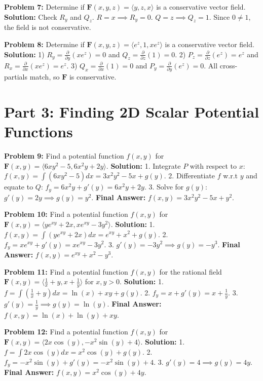 \documentclass[12pt]{article}
\begin{document}
\textbf{Problem 7:} Determine if $\mathbf{F}(x,y,z) = \langle y, z, x \rangle$ is a conservative vector field.
\textbf{Solution:} Check $R_y$ and $Q_z$. 
$R = x \implies R_y = 0$. $Q = z \implies Q_z = 1$. 
Since $0 \neq 1$, the field is not conservative.

\textbf{Problem 8:} Determine if $\mathbf{F}(x,y,z) = \langle e^z, 1, x e^z \rangle$ is a conservative vector field.
\textbf{Solution:} 
1) $R_y = \frac{\partial}{\partial y}(x e^z) = 0$ and $Q_z = \frac{\partial}{\partial z}(1) = 0$.
2) $P_z = \frac{\partial}{\partial z}(e^z) = e^z$ and $R_x = \frac{\partial}{\partial x}(x e^z) = e^z$.
3) $Q_x = \frac{\partial}{\partial x}(1) = 0$ and $P_y = \frac{\partial}{\partial y}(e^z) = 0$.
All cross-partials match, so $\mathbf{F}$ is conservative.

\section*{Part 3: Finding 2D Scalar Potential Functions}

\textbf{Problem 9:} Find a potential function $f(x,y)$ for $\mathbf{F}(x,y) = \langle 6xy^2 - 5, 6x^2y + 2y \rangle$.
\textbf{Solution:} 
1. Integrate $P$ with respect to $x$: $f(x,y) = \int (6xy^2 - 5) dx = 3x^2y^2 - 5x + g(y)$.
2. Differentiate $f$ w.r.t $y$ and equate to $Q$: $f_y = 6x^2y + g'(y) = 6x^2y + 2y$.
3. Solve for $g(y)$: $g'(y) = 2y \implies g(y) = y^2$. 
\textbf{Final Answer:} $f(x,y) = 3x^2y^2 - 5x + y^2$.

\textbf{Problem 10:} Find a potential function $f(x,y)$ for $\mathbf{F}(x,y) = \langle y e^{xy} + 2x, x e^{xy} - 3y^2 \rangle$.
\textbf{Solution:} 
1. $f(x,y) = \int (y e^{xy} + 2x) dx = e^{xy} + x^2 + g(y)$.
2. $f_y = x e^{xy} + g'(y) = x e^{xy} - 3y^2$.
3. $g'(y) = -3y^2 \implies g(y) = -y^3$.
\textbf{Final Answer:} $f(x,y) = e^{xy} + x^2 - y^3$.

\textbf{Problem 11:} Find a potential function $f(x,y)$ for the rational field $\mathbf{F}(x,y) = \langle \frac{1}{x} + y, x + \frac{1}{y} \rangle$ for $x,y > 0$.
\textbf{Solution:} 
1. $f = \int (\frac{1}{x} + y) dx = \ln(x) + xy + g(y)$.
2. $f_y = x + g'(y) = x + \frac{1}{y}$.
3. $g'(y) = \frac{1}{y} \implies g(y) = \ln(y)$.
\textbf{Final Answer:} $f(x,y) = \ln(x) + \ln(y) + xy$.

\textbf{Problem 12:} Find a potential function $f(x,y)$ for $\mathbf{F}(x,y) = \langle 2x \cos(y), -x^2 \sin(y) + 4 \rangle$.
\textbf{Solution:} 
1. $f = \int 2x \cos(y) dx = x^2 \cos(y) + g(y)$.
2. $f_y = -x^2 \sin(y) + g'(y) = -x^2 \sin(y) + 4$.
3. $g'(y) = 4 \implies g(y) = 4y$.
\textbf{Final Answer:} $f(x,y) = x^2 \cos(y) + 4y$.
\end{document}
